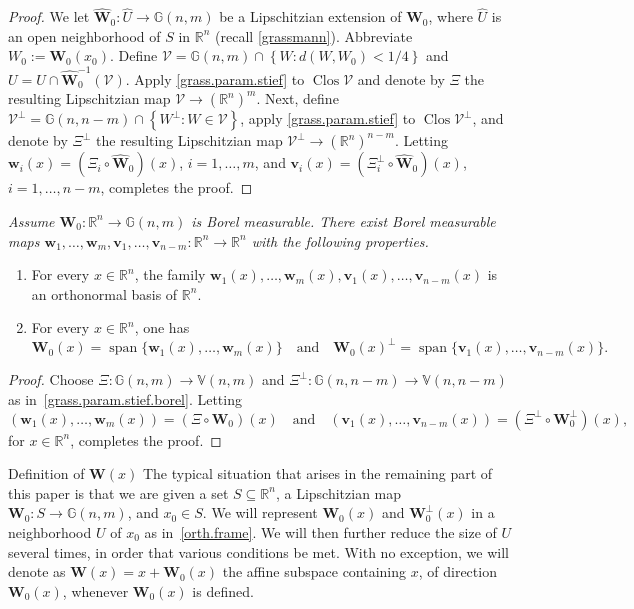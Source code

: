 \documentclass[JEP,XML,SOM,Unicode,ThmDefs,NoEqCountersInSection]{cedram}
\newcommand{\quand}{\quad\text{and}\quad}
\newenvironment{Empty}[2][\null]{%
\begin{enonce}[remark]{#1}#2}
{\end{enonce}}
\newcommand{\R}{\mathbb{R}}
\newcommand{\Rn}{\R^n}
\newcommand{\calV}{\mathscr{V}}
\newcommand{\bW}{{\boldsymbol{W}}}
\newcommand{\bv}{{\boldsymbol{v}}}
\newcommand{\bw}{{\boldsymbol{w}}}
\newcommand{\bV}{\mathbb{V}}
\newcommand{\bG}{\mathbb{G}}
\DeclareMathOperator{\rmClos}{\mathrm{Clos}}
\DeclareMathOperator{\rmspan}{\mathrm{span}}
\let\wh\widehat
\let\subset\subseteq
\begin{document}
\begin{proof}
We let $\wh{\bW}_0: \wh{U} \to \bG(n,m)$ be a Lipschitzian extension of $\bW_0$, where $\wh{U}$ is an open neighborhood of $S$ in $\Rn$ (recall \ref{grassmann}).
Abbreviate $W_0:= \bW_0(x_0)$.
Define $\calV = \bG(n,m) \cap \left\{ W: d(W,W_0) < 1/4 \right\}$ and $U = \wh{U} \cap \wh{\bW}_0^{-1}(\calV)$.
Apply \ref{grass.param.stief} to $\rmClos \calV$ and denote by $\Xi$ the resulting Lipschitzian map $\calV \to (\Rn)^m$.
Next, define $\calV^\perp = \bG(n,n-m) \cap \left\{ W^\perp: W \in \calV \right\}$, apply \ref{grass.param.stief} to $\rmClos \calV^\perp$, and denote by $\Xi^\perp$ the resulting Lipschitzian map $\calV^\perp \to (\Rn)^{n-m}$.
Letting $\bw_i(x) =(\Xi_i \circ \wh{\bW}_0)(x)$, $i=1,\ldots,m$, and $\bv_i(x) =(\Xi^\perp_i \circ \wh{\bW}_0)(x)$, $i=1,\ldots,n-m$, completes the proof.
\end{proof}

\begin{Empty}[]
\label{orth.frame.borel}
{\it
Assume $\bW_0: \Rn \to \bG(n,m)$ is Borel measurable. There exist Borel measurable maps $\bw_1,\ldots,\bw_m,\bv_1,\ldots,\bv_{n-m}: \Rn \to \Rn$ with the following properties.
\begin{enumerate}
\item For every $x\!\in\!\Rn$, the family $\bw_1(x),\ldots,\bw_m(x),\bv_1(x),\ldots,\bv_{n-m}(x)$ is an ortho\-normal basis of $\Rn$.
\item For every $x \in\Rn$, one has
\begin{equation*}
\bW_0(x) = \rmspan \{ \bw_1(x),\ldots,\bw_m(x) \}
\quand\bW_0(x)^\perp = \rmspan \{ \bv_1(x),\ldots,\bv_{n-m}(x) \}.
\end{equation*}
\end{enumerate}
}
\end{Empty}

\begin{proof}
Choose $\Xi: \bG(n,m) \to \bV(n,m)$ and $\Xi^\perp: \bG(n,n-m) \to \bV(n,n-m)$ as in~\ref{grass.param.stief.borel}.
Letting
\[
\left(\bw_1(x),\ldots,\bw_m(x)\right) =(\Xi \circ \bW_0)(x)\quand\left(\bv_1(x),\ldots,\bv_{n-m}(x)\right) =(\Xi^\perp \circ \bW_0^\perp)(x),
\]
for $x \in \Rn$, completes the proof.
\end{proof}

\begin{Empty}[Definition of $\bW(x)$]
\label{W}
The typical situation that arises in the remaining part of this paper is that we are given a set $S \subset \Rn$, a Lipschitzian map $\bW_0: S \to \bG(n,m)$, and $x_0 \in S$.
We will represent $\bW_0(x)$ and $\bW_0^\perp(x)$ in a neighborhood $U$ of $x_0$ as in~\ref{orth.frame}.
We will then further reduce the size of $U$ several times, in order that various conditions be met.
With no exception, we will denote as $\bW(x) = x + \bW_0(x)$ the affine subspace containing $x$, of direction $\bW_0(x)$, whenever $\bW_0(x)$ is defined.
\end{Empty}
\end{document}
